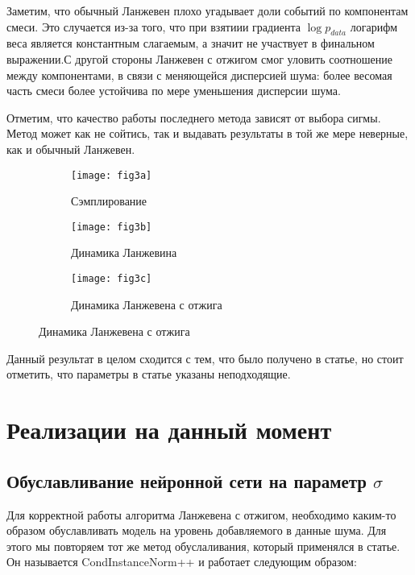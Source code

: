 \documentclass{article}
\begin{document}
Заметим, что обычный Ланжевен плохо угадывает доли событий по компонентам смеси. Это случается из-за того, что при взятиии градиента $\log p_{data}$ логарифм веса является константным слагаемым, а значит не участвует в финальном выражении.С другой стороны Ланжевен с отжигом смог уловить соотношение между компонентами, в связи с меняющейся дисперсией шума: более весомая часть смеси более устойчива по мере уменьшения дисперсии шума.


Отметим, что качество работы последнего метода зависят от выбора сигмы. Метод может как не сойтись, так и выдавать результаты в той же мере неверные, как и обычный Ланжевен.




\begin{figure}[H]
	\centering
	\begin{subfigure}[b]{0.4\textwidth}
		\texttt{[image: fig3a]}
		\caption{Сэмплирование}
		\label{fig:3a}
	\end{subfigure}
	\begin{subfigure}[b]{0.4\textwidth}
		\texttt{[image: fig3b]}
		\caption{Динамика Ланжевина}
		\label{fig:3b}
	\end{subfigure}
	\begin{subfigure}[b]{0.4\textwidth}
		\texttt{[image: fig3c]}
		\caption{Динамика Ланжевена с отжига}
		\label{fig:3c}
	\end{subfigure}
\end{figure}

Данный результат в целом сходится с тем, что было получено в статье, но стоит отметить, что параметры в статье указаны неподходящие.


\section{Реализации на данный момент}

\subsection{Обуславливание нейронной сети на параметр $\sigma$}

Для корректной работы алгоритма Ланжевена с отжигом, необходимо каким-то образом обуславливать модель
на уровень добавляемого в данные шума. Для этого мы повторяем тот же метод обуслаливания, который
применялся в статье. Он называется CondInstanceNorm++ и работает следующим образом:
\end{document}
